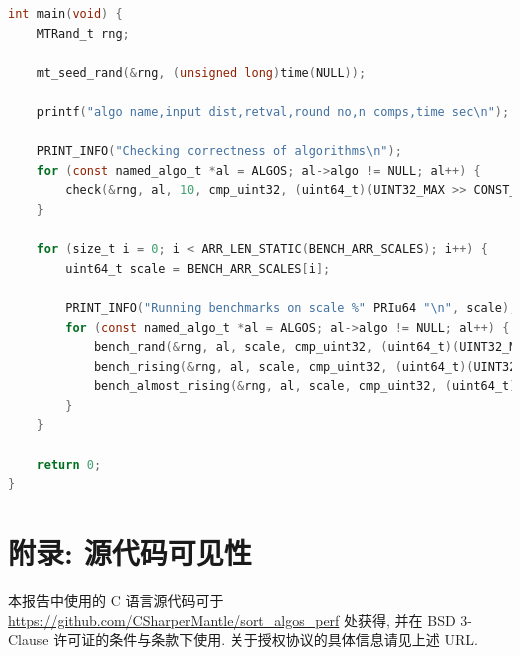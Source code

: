 \documentclass[12pt]{article}
\begin{document}
\begin{lstlisting}[language=C]
int main(void) {
    MTRand_t rng;

    mt_seed_rand(&rng, (unsigned long)time(NULL));

    printf("algo name,input dist,retval,round no,n comps,time sec\n");

    PRINT_INFO("Checking correctness of algorithms\n");
    for (const named_algo_t *al = ALGOS; al->algo != NULL; al++) {
        check(&rng, al, 10, cmp_uint32, (uint64_t)(UINT32_MAX >> CONST_CHECK_SHIFT_DIST), gen_rand_data);
    }

    for (size_t i = 0; i < ARR_LEN_STATIC(BENCH_ARR_SCALES); i++) {
        uint64_t scale = BENCH_ARR_SCALES[i];

        PRINT_INFO("Running benchmarks on scale %" PRIu64 "\n", scale);
        for (const named_algo_t *al = ALGOS; al->algo != NULL; al++) {
            bench_rand(&rng, al, scale, cmp_uint32, (uint64_t)(UINT32_MAX >> CONST_BENCH_SHIFT_DIST));
            bench_rising(&rng, al, scale, cmp_uint32, (uint64_t)(UINT32_MAX >> CONST_BENCH_SHIFT_DIST));
            bench_almost_rising(&rng, al, scale, cmp_uint32, (uint64_t)(UINT32_MAX >> CONST_BENCH_SHIFT_DIST));
        }
    }

    return 0;
}
\end{lstlisting}

\section{附录: 源代码可见性}

本报告中使用的 C 语言源代码可于 \url{https://github.com/CSharperMantle/sort_algos_perf} 处获得, 并在 BSD 3-Clause 许可证的条件与条款下使用. 关于授权协议的具体信息请见上述 URL.
\end{document}
